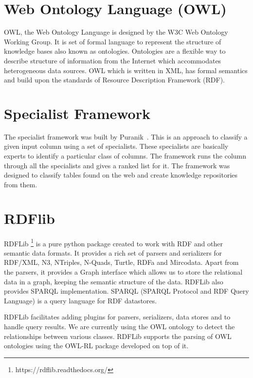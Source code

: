 \section{Web Ontology Language (OWL)}

OWL, the Web Ontology Language is designed by the W3C Web Ontology Working Group. It is set of formal language to represent the structure of knowledge bases also known as ontologies. Ontologies are a flexible way to describe structure of information from the Internet which accommodates heterogeneous data sources. OWL which is written in XML, has formal semantics and build upon the standards of Resource Description Framework (RDF).

\section{Specialist Framework}

The specialist framework was built by Puranik~\cite{puranik2012specialist}. This is an approach to classify a given input column using a set of specialists. These specialists are basically experts to identify a particular class of columns. The framework runs the column through all the specialists and gives a ranked list for it. The framework was designed to classify tables found on the web and create knowledge repositories from them.

\section{RDFlib}

RDFLib \footnote{https://rdflib.readthedocs.org/} is a pure python package created to work with RDF and other semantic data formats. It provides a rich set of parsers and serializers for RDF/XML, N3, NTriples, N-Quads, Turtle, RDFa and Mircodata. Apart from the parsers, it provides a Graph interface which allows us to store the relational data in a graph, keeping the semantic structure of the data. RDFLib also provides SPARQL implementation. SPARQL (SPARQL Protocol and RDF Query Language) is a query language for RDF datastores. 

RDFLib facilitates adding plugins for parsers, serializers, data stores and to handle query results. We are currently using the OWL ontology to detect the relationships between various classes. RDFLib supports the parsing of OWL ontologies using the OWL-RL package developed on top of it.
